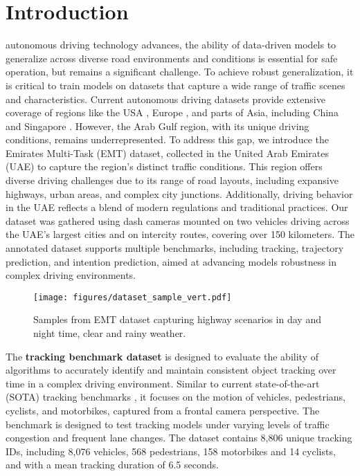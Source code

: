 \section{Introduction}


 autonomous driving technology advances, the ability of data-driven models to generalize across diverse road environments and conditions is essential for safe operation, but remains a significant challenge. To achieve robust generalization, it is critical to train models on datasets that capture a wide range of traffic scenes and characteristics. Current autonomous driving datasets provide extensive coverage of regions like the USA \cite{nuscenes2019, Houston2020OneTA, Argoverse, Argoverse2, TrustButVerify}, Europe \cite{Geiger2013IJRR, Liao2022PAMI}, and parts of Asia, including China and Singapore \cite{10.1609/aaai.v33i01.33016120, nuscenes2019}. However, the Arab Gulf region, with its unique driving conditions, remains underrepresented. To address this gap, we introduce the Emirates Multi-Task (EMT) dataset, collected in the United Arab Emirates (UAE) to capture the region's distinct traffic conditions. This region offers diverse driving challenges due to its range of road layouts, including expansive highways, urban areas, and complex city junctions. Additionally, driving behavior in the UAE reflects a blend of modern regulations and traditional practices. Our dataset was gathered using dash cameras mounted on two vehicles driving across the UAE’s largest cities and on intercity routes, covering over 150 kilometers. The annotated dataset supports multiple benchmarks, including tracking, trajectory prediction, and intention prediction, aimed at advancing models robustness in complex driving environments.

\begin{figure}[t!]
\centering
\texttt{[image: figures/dataset\_sample\_vert.pdf]}
\caption{Samples from EMT dataset capturing highway scenarios in day and night time, clear and rainy weather.}
\label{fig:sample}
\end{figure}


The \textbf{tracking benchmark dataset} is designed to evaluate the ability of algorithms to accurately identify and maintain consistent object tracking over time in a complex driving environment. Similar to current state-of-the-art (SOTA) tracking benchmarks \cite{Geiger2012AreWR, nuscenes2019, 9709630}, it focuses on the motion of vehicles, pedestrians, cyclists, and motorbikes, captured from a frontal camera perspective. The benchmark is designed to test tracking models under varying levels of traffic congestion and frequent lane changes. The dataset contains 8,806 unique tracking IDs, including 8,076 vehicles, 568 pedestrians, 158 motorbikes and 14 cyclists, and with a mean tracking duration of 6.5 seconds.

